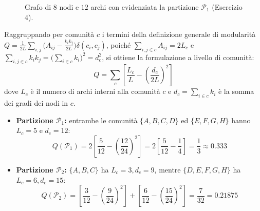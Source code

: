 \begin{figure}[H]
\centering
{}
\caption{Grafo di $8$ nodi e $12$ archi con evidenziata la partizione $\mathcal{P}_1$ (Esercizio 4).}
\label{fig:dm-ex-ns-g4}
\end{figure}

Raggruppando per comunit\`a $c$ i termini della definizione generale di modularit\`a $Q = \frac{1}{2L}\sum_{i,j}\bigl(A_{ij} - \frac{k_i k_j}{2L}\bigr)\delta(c_i, c_j)$, poich\'e $\sum_{i,j \in c} A_{ij} = 2L_c$ e $\sum_{i,j \in c} k_i k_j = \bigl(\sum_{i \in c} k_i\bigr)^2 = d_c^2$, si ottiene la formulazione a livello di comunit\`a:
\begin{equation}
    Q = \sum_{c} \left[ \frac{L_c}{L} - \left(\frac{d_c}{2L}\right)^2 \right]
\end{equation}
dove $L_c$ \`e il numero di archi interni alla comunit\`a $c$ e $d_c = \sum_{i \in c} k_i$ \`e la somma dei gradi dei nodi in $c$.

\begin{itemize}
    \item \textbf{Partizione $\mathcal{P}_1$:} entrambe le comunit\`a $\{A,B,C,D\}$ ed $\{E,F,G,H\}$ hanno $L_c = 5$ e $d_c = 12$:
    \begin{equation*}
        Q(\mathcal{P}_1) = 2 \left[ \frac{5}{12} - \left(\frac{12}{24}\right)^2 \right] = 2 \left[ \frac{5}{12} - \frac{1}{4} \right] = \frac{1}{3} \approx 0.333
    \end{equation*}
    \item \textbf{Partizione $\mathcal{P}_2$:} $\{A,B,C\}$ ha $L_c = 3, d_c = 9$, mentre $\{D,E,F,G,H\}$ ha $L_c = 6, d_c = 15$:
    \begin{equation*}
        Q(\mathcal{P}_2) = \left[ \frac{3}{12} - \left(\frac{9}{24}\right)^2 \right] + \left[ \frac{6}{12} - \left(\frac{15}{24}\right)^2 \right] = \frac{7}{32} = 0.21875
    \end{equation*}
\end{itemize}

